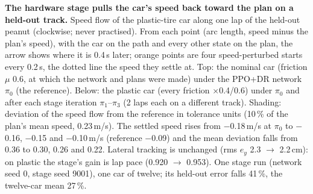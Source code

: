\caption{\textbf{The hardware stage pulls the car's speed back toward the plan on a held-out track.} Speed flow of the plastic-tire
car along one lap of the held-out peanut (clockwise; never practised). From each point (arc length, speed minus the plan's speed),
with the car on the path and every other state on the plan, the arrow shows where it is 0.4\,s later; orange points are four
speed-perturbed starts every 0.2\,s, the dotted line the speed they settle at. Top: the nominal car (friction $\mu$ 0.6, at which the
network and plans were made) under the PPO+DR network $\pi_0$ (the reference). Below: the plastic car (every friction $\times$0.4/0.6)
under $\pi_0$ and after each stage iteration $\pi_1$--$\pi_3$ (2 laps each on a different track). Shading: deviation of the speed flow from
the reference in tolerance units (10\,\% of the plan's mean speed, 0.23\,m/s). The settled speed rises from $-$0.18\,m/s at $\pi_0$ to
$-$0.16, $-$0.15 and $-$0.10\,m/s (reference $-$0.09) and the mean deviation falls from 0.36 to 0.30, 0.26 and 0.22. Lateral
tracking is unchanged (rms $e_y$ 2.3 $\rightarrow$ 2.2\,cm): on plastic the stage's gain is lap pace (0.920 $\rightarrow$ 0.953).
One stage run (network seed 0, stage seed 9001), one car of twelve; its held-out error falls 41\,\%, the twelve-car mean 27\,\%.}
